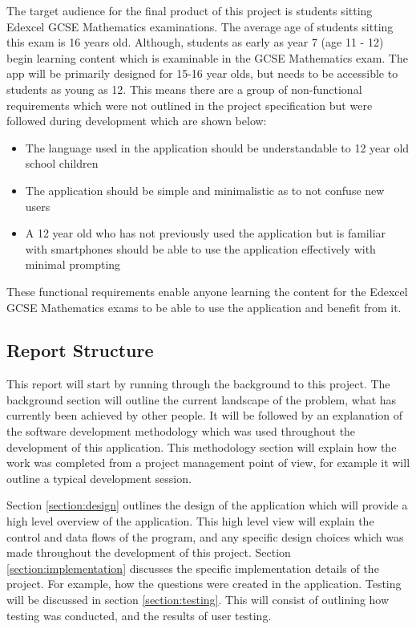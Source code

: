 \documentclass{article}
\begin{document}
The target audience for the final product of this project is students sitting Edexcel GCSE Mathematics examinations. The average age of students sitting this exam is 16 years old. Although, students as early as year 7 (age 11 - 12) begin learning content which is examinable in the GCSE Mathematics exam. The app will be primarily designed for 15-16 year olds, but needs to be accessible to students as young as 12. This means there are a group of non-functional requirements which were not outlined in the project specification but were followed during development which are shown below: 

\begin{itemize}
	\item The language used in the application should be understandable to 12 year old school children
	\item The application should be simple and minimalistic as to not confuse new users
	\item A 12 year old who has not previously used the application but is familiar with smartphones should be able to use the application effectively with minimal prompting
\end{itemize}

These functional requirements enable anyone learning the content for the Edexcel GCSE Mathematics exams to be able to use the application and benefit from it.

\subsection{Report Structure}

This report will start by running through the background to this project. The background section will outline the current landscape of the problem, what has currently been achieved by other people. It will be followed by an explanation of the software development methodology which was used throughout the development of this application. This methodology section will explain how the work was completed from a project management point of view, for example it will outline a typical development session. \par

Section \ref{section:design} outlines the design of the application which will provide a high level overview of the application. This high level view will explain the control and data flows of the program, and any specific design choices which was made throughout the development of this project. Section \ref{section:implementation} discusses the specific implementation details of the project. For example, how the questions were created in the application. Testing will be discussed in section \ref{section:testing}. This will consist of outlining how testing was conducted, and the results of user testing. \par
\end{document}

